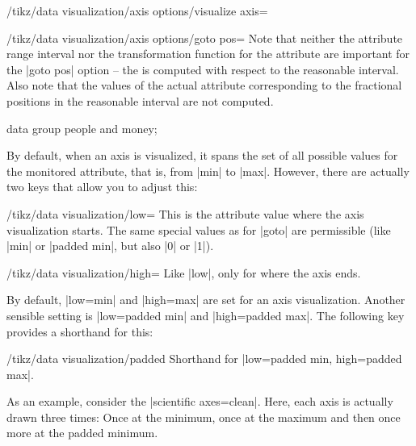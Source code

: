 \begin{key}{/tikz/data visualization/axis options/visualize axis=}
\begin{key}{/tikz/data visualization/axis options/goto pos=}
        Note that neither the attribute range interval nor the transformation function for the attribute are important for the |goto pos| option -- the  is computed with respect to the reasonable interval. Also note that the values of the actual attribute corresponding to the fractional positions in the reasonable interval are not computed.
\begin{codeexample}[
    preamble={\usetikzlibrary{datavisualization}},
    pre={\tikzdatavisualizationset{
  our system/.style={
    new Cartesian axis=x axis,
    new Cartesian axis=left axis,
    new Cartesian axis=right axis,
    x axis={attribute=x},
    left axis={unit vector={(0cm,1pt)}},
    right axis={unit vector={(0cm,1pt)}},
    x axis    ={length=\pgfkeysvalueof{/tikz/data visualization/scientific axes/width}},
    left axis ={length=\pgfkeysvalueof{/tikz/data visualization/scientific axes/height}},
    right axis={length=\pgfkeysvalueof{/tikz/data visualization/scientific axes/height}}
  }
}}]
\tikz \datavisualization [
    our system,
    x axis={attribute=time, length=4cm},
    left axis ={attribute=money},
    right axis={attribute=people},
    visualize as line/.list={people 1, people 2, money 1, money 2}]
  data group {people and money};
\end{codeexample}
    \end{key}

    By default, when an axis is visualized, it spans the set of all possible values for the monitored attribute, that is, from |min| to |max|. However, there are actually two keys that allow you to adjust this:
    \begin{key}{/tikz/data visualization/low=}
        This is the attribute value where the axis visualization starts. The same special values as for |goto| are permissible (like |min| or |padded min|, but also |0| or |1|).
    \end{key}
    \begin{key}{/tikz/data visualization/high=}
        Like |low|, only for where the axis ends.
    \end{key}

    By default, |low=min| and |high=max| are set for an axis visualization. Another sensible setting is |low=padded min| and |high=padded max|. The following key provides a shorthand for this:
    \begin{key}{/tikz/data visualization/padded}
        Shorthand for |low=padded min, high=padded max|.
    \end{key}
    As an example, consider the |scientific axes=clean|. Here, each axis is actually drawn three times: Once at the minimum, once at the maximum and then once more at the padded minimum.



\end{key}
